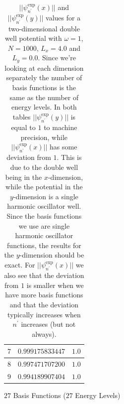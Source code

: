\documentclass[../main.tex]{subfiles}
\begin{document}
\begin{table}[!ht]
\begin{subtable}{.4\linewidth}
\begin{tabular}{ | c | c | c | }
        $7$ & $0.999175833447$ & $1.0$\\*
        \hline
        $8$ & $0.997471707200$ & $1.0$\\*
        \hline
        $9$ & $0.994189907404$ & $1.0$\\*
        \hline
    \end{tabular}
    \caption{$27$ Basis Functions ($27$ Energy Levels)}
    \label{tab:NormE27}
  \end{subtable}
  \caption{$||\psi_{n^\prime}^\textrm{exp}(x)||$ and $||\psi_{n^\prime}^\textrm{exp}(y)||$ values for a two-dimensional double well potential with $\omega = 1$, $N = 1000$, $L_x = 4.0$ and $L_y = 0.0$. Since we're looking at each dimension separately the number of basis functions is the same as the number of energy levels. In both tables $||\psi_{n^\prime}^\textrm{exp}(y)||$ is equal to $1$ to machine precision, while $||\psi_{n^\prime}^\textrm{exp}(x)||$ has some deviation from $1$. This is due to the double well being in the $x$-dimension, while the potential in the $y$-dimension is a single harmonic oscillator well. Since the basis functions we use are single harmonic oscillator functions, the results for the $y$-dimension should be exact. For $||\psi_{n^\prime}^\textrm{exp}(x)||$ we also see that the deviation from $1$ is smaller when we have more basis functions and that the deviation typically increases when $n^\prime$ increases (but not always).}
  \label{tab:Norm}
\end{table}
\end{document}
